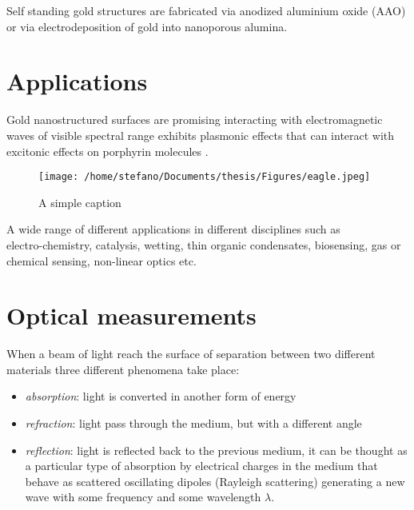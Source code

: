 Self standing gold structures are fabricated via anodized aluminium oxide (AAO) or via electrodeposition of gold into nanoporous alumina.



\section{Applications}

Gold nanostructured surfaces are promising interacting with electromagnetic waves of visible spectral range exhibits plasmonic effects that can interact with excitonic effects on porphyrin molecules \cite{plasmonic_review}.

\begin{figure}[ht!]
	\centering %
		\texttt{[image: /home/stefano/Documents/thesis/Figures/eagle.jpeg]}
	\caption{A simple caption \label{overflow}}
\end{figure}

A wide range of different applications in different disciplines such as\\

electro-chemistry, catalysis, wetting, thin organic condensates, biosensing, gas or chemical sensing, non-linear optics etc.  



\section{Optical measurements}


When a beam of light reach the surface of separation between two different materials three different phenomena take place:
\begin{itemize}
	\item \emph{absorption}: light is converted in another form of energy
	\item \emph{refraction}: light pass through the medium, but with a different angle
	\item \emph{reflection}: light is reflected back to the previous medium, it can be thought as a particular type of absorption by electrical charges in the medium that behave as scattered oscillating dipoles (Rayleigh scattering) generating a new wave with some frequency and some wavelength $\lambda$.
\end{itemize}




